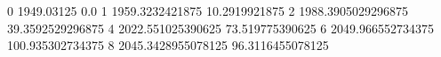 0 1949.03125 0.0
1 1959.3232421875 10.2919921875
2 1988.3905029296875 39.3592529296875
4 2022.551025390625 73.519775390625
6 2049.966552734375 100.935302734375
8 2045.3428955078125 96.3116455078125
